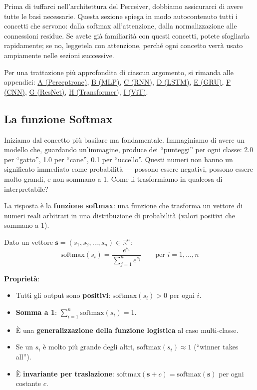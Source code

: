 \documentclass[12pt,a4paper]{article}
\begin{document}
Prima di tuffarci nell'architettura del Perceiver, dobbiamo assicurarci di avere tutte le basi necessarie. Questa sezione spiega in modo autocontenuto tutti i concetti che servono: dalla softmax all'attenzione, dalla normalizzazione alle connessioni residue. Se avete gi\`a familiarit\`a con questi concetti, potete sfogliarla rapidamente; se no, leggetela con attenzione, perch\'e ogni concetto verr\`a usato ampiamente nelle sezioni successive.

Per una trattazione pi\`u approfondita di ciascun argomento, si rimanda alle appendici: \hyperref[app:perceptron]{A (Perceptrone)}, \hyperref[app:feedforward]{B (MLP)}, \hyperref[app:rnn]{C (RNN)}, \hyperref[app:lstm]{D (LSTM)}, \hyperref[app:gru]{E (GRU)}, \hyperref[app:cnn]{F (CNN)}, \hyperref[app:resnet]{G (ResNet)}, \hyperref[app:transformer]{H (Transformer)}, \hyperref[app:vit]{I (ViT)}.

\subsection{La funzione Softmax} \label{sec:softmax}

Iniziamo dal concetto pi\`u basilare ma fondamentale. Immaginiamo di avere un modello che, guardando un'immagine, produce dei ``punteggi'' per ogni classe: 2.0 per ``gatto'', 1.0 per ``cane'', 0.1 per ``uccello''. Questi numeri non hanno un significato immediato come probabilit\`a --- possono essere negativi, possono essere molto grandi, e non sommano a 1. Come li trasformiamo in qualcosa di interpretabile?

La risposta \`e la \textbf{funzione softmax}: una funzione che trasforma un vettore di numeri reali arbitrari in una distribuzione di probabilit\`a (valori positivi che sommano a 1).

\begin{formulabox}
Dato un vettore $\mathbf{s} = (s_1, s_2, \ldots, s_n) \in \mathbb{R}^n$:
\[
    \text{softmax}(s_i) = \frac{e^{s_i}}{\sum_{j=1}^{n} e^{s_j}} \qquad \text{per } i = 1, \ldots, n
\]

\textbf{Propriet\`a}:
\begin{itemize}
    \item Tutti gli output sono \textbf{positivi}: $\text{softmax}(s_i) > 0$ per ogni $i$.
    \item \textbf{Somma a 1}: $\sum_{i=1}^n \text{softmax}(s_i) = 1$.
    \item \`E una \textbf{generalizzazione della funzione logistica} al caso multi-classe.
    \item Se un $s_i$ \`e molto pi\`u grande degli altri, $\text{softmax}(s_i) \approx 1$ (``winner takes all'').
    \item \`E \textbf{invariante per traslazione}: $\text{softmax}(\mathbf{s} + c) = \text{softmax}(\mathbf{s})$ per ogni costante $c$.
\end{itemize}
\end{formulabox}
\end{document}
